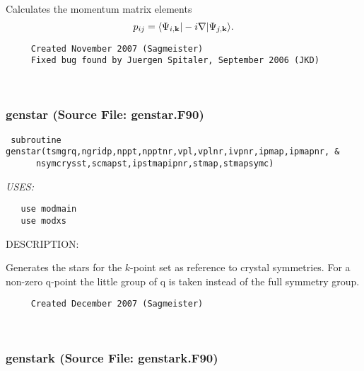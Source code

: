 \documentclass[11pt]{article}
\begin{document}
     Calculates the momentum matrix elements
     $$ p_{ij}=\langle\Psi_{i,{\bf k}}|-i\nabla|\Psi_{j,{\bf k}}\rangle. $$
  
\begin{verbatim}     Created November 2007 (Sagmeister)
     Fixed bug found by Juergen Spitaler, September 2006 (JKD)\end{verbatim}






 
 
\mbox{}\hrulefill\ 
 
\subsubsection{genstar (Source File: genstar.F90)}


\begin{verbatim} subroutine genstar(tsmgrq,ngridp,nppt,npptnr,vpl,vplnr,ivpnr,ipmap,ipmapnr, &
      nsymcrysst,scmapst,ipstmapipnr,stmap,stmapsymc)\end{verbatim}{\em USES:}
\begin{verbatim}   use modmain
   use modxs\end{verbatim}
{\sf DESCRIPTION:\\ }


     Generates the stars for the $k$-point set as reference to crystal
     symmetries. For a non-zero q-point the little group of q is taken
     instead of the full symmetry group.
  
\begin{verbatim}     Created December 2007 (Sagmeister)\end{verbatim}


 
 
\mbox{}\hrulefill\ 
 
\subsubsection{genstark (Source File: genstark.F90)}
\end{document}
